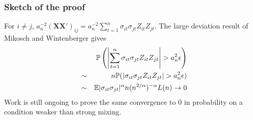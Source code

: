 \documentclass{beamer}
\renewcommand{\P}{
\mathbb P
}
\begin{document}
\begin{frame}
  \frametitle{Sketch of the proof}
  For $i \neq j$, $    a_n^{-2} (\mathbf{XX'})_{ij} = a_n^{-2} \sum_{t=1}^n
  \sigma_{it} \sigma_{jt} Z_{it} Z_{jt}$. The large deviation result
  of Mikosch and Wintenberger gives
  \begin{eqnarray*}
    && \P\left(
      \left|\sum_{t=1}^n \sigma_{it} \sigma_{jt} Z_{it} Z_{jt}\right| > a_n^2 \epsilon
    \right) \\
    &\sim& n \P(|\sigma_{it} \sigma_{jt} Z_{it} Z_{jt}| > a_n^2
    \epsilon) \\
    &\sim& \E |\sigma_{it} \sigma_{jt}|^\alpha n
    (n^{2/\alpha})^{-\alpha} L(n) \to 0
  \end{eqnarray*}
Work is still ongoing to prove the same convergence to 0 in
probability on a condition weaker than strong mixing.
\end{frame}


\end{document}
